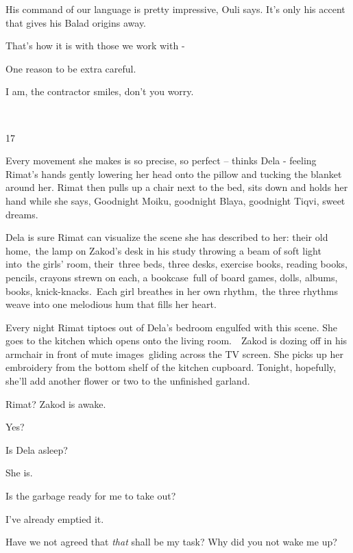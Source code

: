 \documentclass[letterpaper]{article}
\begin{document}
{\textquotedbl}His command of our language is pretty impressive,{\textquotedbl} Ouli says. {\textquotedbl}It's only his
accent that gives his Balad origins away.{\textquotedbl}

{\textquotedbl}That's how it is with those we work with -{\textquotedbl}\ 

{\textquotedbl}One reason to be extra careful.{\textquotedbl}

{\textquotedbl}I am,{\textquotedbl} the contractor smiles, {\textquotedbl}don't you worry.{\textquotedbl}

~

17

Every movement she makes is so precise, so perfect -- thinks Dela - feeling Rimat's hands gently lowering her head onto
the pillow and tucking the blanket around her. Rimat then pulls up a chair next to the bed, sits down and holds her
hand while she says, {\textquotedbl}Goodnight Moiku, goodnight Blaya, goodnight Tiqvi, sweet dreams.{\textquotedbl}\ 

Dela is sure Rimat can visualize the scene she has described to her: their old home,\ the lamp on Zakod's desk in his
study throwing a beam of soft light into\ the girls' room, their\ three beds, three desks, exercise books, reading
books, pencils, crayons strewn on each, a bookcase~full of board games, dolls, albums, books, knick-knacks.\ Each girl
breathes in her own rhythm,\ the three rhythms weave into one melodious hum that fills her heart.\ 

Every night Rimat tiptoes out of Dela's bedroom engulfed with this scene. She goes to the kitchen which opens onto the
living room.\ \ Zakod is dozing off in his armchair in front of mute images~gliding across the TV screen. She picks up
her embroidery from the bottom shelf of the kitchen cupboard. Tonight, hopefully, she'll add another flower or two to
the unfinished garland.

{\textquotedbl}Rimat?{\textquotedbl} Zakod is awake. 

{\textquotedbl}Yes?{\textquotedbl}

{\textquotedbl}Is Dela asleep?{\textquotedbl} 

{\textquotedbl}She is.{\textquotedbl} 

{\textquotedbl}Is the garbage ready for me to take out?{\textquotedbl} 

{\textquotedbl}I've already emptied it.{\textquotedbl} 

{\textquotedbl}Have we not agreed that \textit{that} shall be my task? Why did you not wake me up?{\textquotedbl} 
\end{document}
